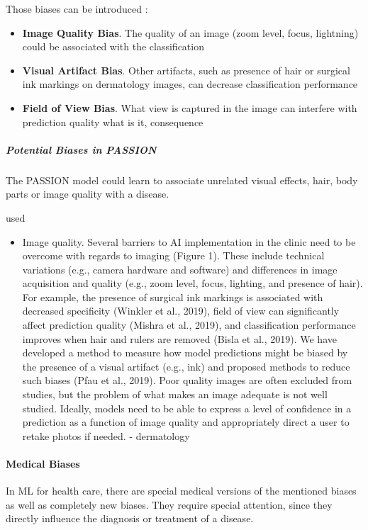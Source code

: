 \begin{refsection}
		Those biases can be introduced :
		\begin{itemize}
			\item \textbf{Image Quality Bias}. The quality of an image (zoom level, focus, lightning) could be associated with the classification \autocite{Young_2020}
			\item \textbf{Visual Artifact Bias}. Other artifacts, such as presence of hair or surgical ink markings on dermatology images, can decrease classification performance \autocite{Winkler et al., 2019 & Bisla et al., 2019 (from Young_2020)}
			\item \textbf{Field of View Bias}. What view is captured in the image can interfere with prediction quality  what is it, consequence \autocite{Mishra et al., 2019 from Young_2020}
		\end{itemize}
		
		
		\subparagraph{Potential Biases in PASSION}
		The PASSION model could learn to associate unrelated visual effects, hair, body parts or image quality with a disease.
		
		
		\rawcitationstart
		used
		\begin{itemize}		
			\rawcitationusedstart
			\item Image quality. Several barriers to \gls{AI} implementation in the clinic need to be overcome with regards to imaging (Figure 1). These include technical variations (e.g., camera hardware and software) and differences in image acquisition and quality (e.g., zoom level, focus, lighting, and presence of hair). For example, the presence of surgical ink markings is associated with decreased specificity (Winkler et al., 2019), field of view can significantly affect prediction quality (Mishra et al., 2019), and classification performance improves when hair and rulers are removed (Bisla et al., 2019). We have developed a method to measure how model predictions might be biased by the presence of a visual artifact (e.g., ink) and proposed methods to reduce such biases (Pfau et al., 2019). Poor quality images are often excluded from studies, but the problem of what makes an image adequate is not well studied. Ideally, models need to be able to express a level of confidence in a prediction as a function of image quality and appropriately direct a user to retake photos if needed. \autocite{Young_2020} - dermatology
			\rawcitationusedend
		\end{itemize}
		\rawcitationend
		
		\paragraph{Medical Biases}
		In \gls{ML} for health care, there are special medical versions of the mentioned biases as well as completely new biases. They require special attention, since they directly influence the diagnosis or treatment of a disease.
		

\end{refsection}
